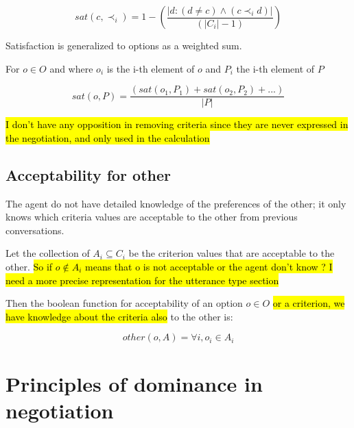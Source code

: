 \documentclass{article}
\begin{document}
	$$sat(c, \prec_i) =	1 - \left( \frac{|{d : (d \neq c)  \wedge (c \prec_i d)}| }{( |C_i| - 1 )}\right)  $$
	
	Satisfaction is generalized to options as a weighted sum.
	
	For $o \in O$ and where $o_i$ is the i-th element of $o$ and $P_i$ the i-th element of $P$
	
	$$sat(o, P) = \frac{\left( sat(o_1, P_1) + sat(o_2, P_2) + ...  \right)}{|P|} $$
	
	\hl{I don't have any opposition in removing criteria since they are never expressed in the negotiation, and only used in the calculation}
	
	\subsection{Acceptability for other}
	
	The agent do not have detailed knowledge of the preferences of the other; it only knows which criteria values are acceptable to the other from previous conversations. 
	
	Let the collection of $A_i \subseteq C_i$ be the criterion values that
	are acceptable to the other.
	 \hl{So if $ o \notin A_i$ means that o is not acceptable or the agent don't know ? I need a more precise representation for the utterance type section } 
	
	Then the boolean function for acceptability of an option $o \in O$ \hl{ or a criterion, we have knowledge about the criteria also}
	to the other is:
	
	$$other(o, A) = \forall i,  o_i \in A_i$$

	
	
	\section{Principles of dominance in negotiation}
	
\end{document}
